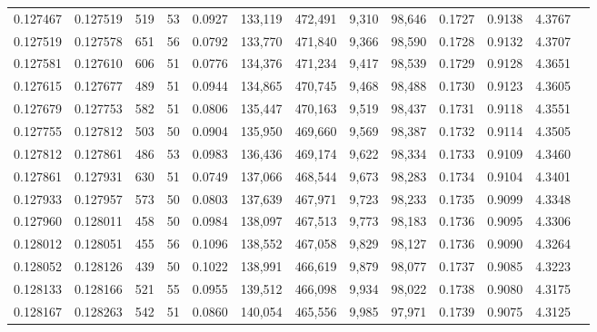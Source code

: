 \begin{tabular}{rrrrrrrrrrrrr}
0.127467 & 0.127519 &   519 &  53 &                                     0.0927 & 133,119 & 472,491 &   9,310 &  98,646 & 0.1727 & 0.9138 & 4.3767 \\
0.127519 & 0.127578 &   651 &  56 &                                     0.0792 & 133,770 & 471,840 &   9,366 &  98,590 & 0.1728 & 0.9132 & 4.3707 \\
0.127581 & 0.127610 &   606 &  51 &                                     0.0776 & 134,376 & 471,234 &   9,417 &  98,539 & 0.1729 & 0.9128 & 4.3651 \\
0.127615 & 0.127677 &   489 &  51 &                                     0.0944 & 134,865 & 470,745 &   9,468 &  98,488 & 0.1730 & 0.9123 & 4.3605 \\
0.127679 & 0.127753 &   582 &  51 &                                     0.0806 & 135,447 & 470,163 &   9,519 &  98,437 & 0.1731 & 0.9118 & 4.3551 \\
0.127755 & 0.127812 &   503 &  50 &                                     0.0904 & 135,950 & 469,660 &   9,569 &  98,387 & 0.1732 & 0.9114 & 4.3505 \\
0.127812 & 0.127861 &   486 &  53 &                                     0.0983 & 136,436 & 469,174 &   9,622 &  98,334 & 0.1733 & 0.9109 & 4.3460 \\
0.127861 & 0.127931 &   630 &  51 &                                     0.0749 & 137,066 & 468,544 &   9,673 &  98,283 & 0.1734 & 0.9104 & 4.3401 \\
0.127933 & 0.127957 &   573 &  50 &                                     0.0803 & 137,639 & 467,971 &   9,723 &  98,233 & 0.1735 & 0.9099 & 4.3348 \\
0.127960 & 0.128011 &   458 &  50 &                                     0.0984 & 138,097 & 467,513 &   9,773 &  98,183 & 0.1736 & 0.9095 & 4.3306 \\
0.128012 & 0.128051 &   455 &  56 &                                     0.1096 & 138,552 & 467,058 &   9,829 &  98,127 & 0.1736 & 0.9090 & 4.3264 \\
0.128052 & 0.128126 &   439 &  50 &                                     0.1022 & 138,991 & 466,619 &   9,879 &  98,077 & 0.1737 & 0.9085 & 4.3223 \\
0.128133 & 0.128166 &   521 &  55 &                                     0.0955 & 139,512 & 466,098 &   9,934 &  98,022 & 0.1738 & 0.9080 & 4.3175 \\
0.128167 & 0.128263 &   542 &  51 &                                     0.0860 & 140,054 & 465,556 &   9,985 &  97,971 & 0.1739 & 0.9075 & 4.3125 \\

\end{tabular}
